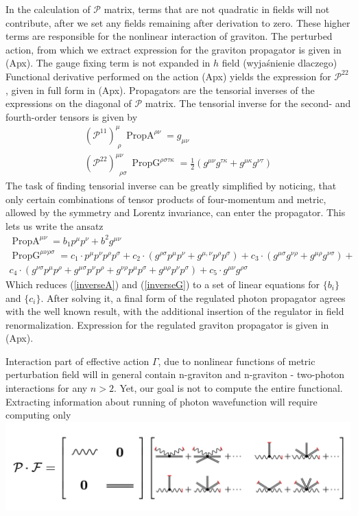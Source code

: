 \documentclass[11pt, a4paper]{article}
\begin{document}
In the calculation of $\mathcal{P}$ matrix, terms that are not quadratic in fields will not contribute, after we set any fields remaining after derivation to zero.
These higher terms are responsible for the nonlinear interaction of graviton. The perturbed action, from which we extract expression
for the graviton propagator is given in (Apx). The gauge fixing term is not expanded in $h$ field (wyjaśnienie dlaczego)
Functional derivative performed on the action (Apx) yields the expression for
$\mathcal{P}^{2 2}$, given in full form in (Apx).
Propagators are the tensorial inverses of the expressions on the diagonal of $\mathcal{P}$ matrix. The tensorial inverse
for the second- and fourth-order tensors is given by
\begin{gather}
    \left(\mathcal{P}^{1 1}\right)^{\mu}_{ \; \rho} \ \operatorname{PropA}^{\rho \nu}  = g_{\mu \nu} \label{inverseA}\\
    \left(\mathcal{P}^{2 2}\right)^{\mu\nu}_{ \; \; \rho \sigma} \ \operatorname{PropG}^{\rho \sigma \tau \kappa} = \frac{1}{2} \left( g^{\mu\nu} g^{\tau\kappa} + g^{\mu\kappa} g^{\nu\tau} \right) \label{inverseG}
\end{gather}
The task of finding tensorial inverse can be greatly simplified by noticing, that only certain combinations of tensor
products of four-momentum and metric, allowed by the symmetry and Lorentz invariance, can enter the propagator.
This lets us write the ansatz
\begin{gather}
    \operatorname{PropA}^{\mu \nu} = b_1 p^{\mu} p^{\nu} + b^2 g^{\mu\nu}\\
    \operatorname{PropG}^{\mu \nu \rho \sigma} =
    c_1 \cdot p^{\mu} p^{\nu}
   p^{\rho} p^{\sigma} + c_2 \cdot
   (g^{\rho \sigma} p^{\mu}
   p^{\nu} + g^{\mu,\nu}
   p^{\rho} p^{\sigma})+c_3 \cdot
   (g^{\mu \sigma} g^{\nu\rho} + g^{\mu \rho}
   g^{\nu\sigma})+ \\ c_4 \cdot (g^{\nu\sigma}
   p^{\mu}
   p^{\rho}+g^{\mu\sigma}
   p^{\nu}
   p^{\rho} +g^{\nu\rho}
   p^{\mu}
   p^{\sigma}+g^{\mu\rho}
   p^{\nu} p^{\sigma})+c_5 \cdot
   g^{\mu \nu} g^{\rho\sigma}
\end{gather}
Which reduces (\ref*{inverseA}) and (\ref*{inverseG}) to a set of linear equations for $\{b_i\}$ and $\{c_i\}$.
After solving it, a final form of the regulated photon propagator agrees with the well known result, with the additional insertion of the regulator in field renormalization.
Expression for the regulated graviton propagator is given in (Apx).

Interaction part of effective action $\Gamma$, due to nonlinear functions of metric perturbation field will in general
contain n-graviton and n-graviton - two-photon interactions for any $n>2$. Yet, our goal is not to compute the entire functional.
Extracting information about running of photon wavefunction will require computing only 
\includegraphics[width=1\textwidth]{figures/drawing.png}
\end{document}
